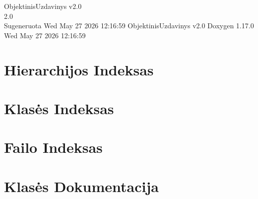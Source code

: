 \documentclass[twoside]{book}
\newcommand{\+}{\discretionary{\mbox{\scriptsize$\hookleftarrow$}}{}{}}
\newcommand{\clearemptydoublepage}{%
    \newpage{\pagestyle{empty}\cleardoublepage}%
  }
\begin{document}
  \raggedbottom
    \hypersetup{pageanchor=false,
                bookmarksnumbered=true,
                pdfencoding=unicode
               }
  \begin{titlepage}
  \vspace*{7cm}
  \begin{center}%
  {\Large Objektinis\+Uzdavinys v2.\+0}\\
  [1ex]\large 2.\+0 \\
  \vspace*{1cm}
  {\large Sugeneruota Wed May 27 2026 12:\+16:\+59 Objektinis\+Uzdavinys v2.\+0  Doxygen 1.17.0}\\
    \vspace*{0.5cm}
    {\small Wed May 27 2026 12:16:59}
  \end{center}
  \end{titlepage}
  \clearemptydoublepage
  \tableofcontents
  \clearemptydoublepage
  \hypersetup{pageanchor=true}
\chapter{Hierarchijos Indeksas}

\chapter{Klasės Indeksas}

\chapter{Failo Indeksas}

\chapter{Klasės Dokumentacija}






























\end{document}
